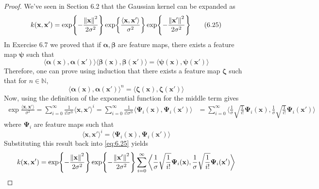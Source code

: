 \vspace{1em}

\begin{proof}
    We've seen in Section 6.2 that the Gaussian kernel can be expanded
    as
    \begin{equation*}
        k(\mathbf{x}, \mathbf{x}') 
        = \exp{-\frac{\norm{\mathbf{x}}^2}{2\sigma^2}}
        \exp{\frac{\langle \mathbf{x}, \mathbf{x}' \rangle}{\sigma^2}}
        \exp{-\frac{\norm{\mathbf{x}'}^2}{2\sigma^2}}
        \tag{6.25}\label{eq:6.25}
    \end{equation*}
    In Exercise 6.7 we proved that if $\bm{\alpha}, \bm{\beta}$ are feature maps,
    there exists a feature map $\bm{\psi}$ such that
    \[
        \langle \bm{\alpha}(\mathbf{x}), \bm{\alpha}(\mathbf{x}') \rangle
        \langle \bm{\beta}(\mathbf{x}), \bm{\beta}(\mathbf{x}') \rangle
        = \langle \bm{\bm{\psi}}(\mathbf{x}), \bm{\psi}(\mathbf{x}') \rangle
    \] 
    Therefore, one can prove using induction that there exists a feature map $\bm{\zeta}$
    such that for $n \in \mathbb{N}$,
    \[
        \langle \bm{\alpha}(\mathbf{x}), \bm{\alpha}(\mathbf{x}')\rangle^n
        = \langle \bm{\zeta}(\mathbf{x}), \bm{\zeta}(\mathbf{x}') \rangle
    \] 
    Now, using the definition of the exponential function for the middle term gives
    \begin{align*}
        \exp{\frac{\langle \mathbf{x}, \mathbf{x}' \rangle}{\sigma^2}}
        = \sum_{i=0}^{\infty} \frac{1}{i! \sigma^{2i}} \langle \mathbf{x}, \mathbf{x}' \rangle^i
        = \sum_{i=0}^{\infty} \frac{1}{i! \sigma^{2i}}
        \langle \bm{\Psi}_i(\mathbf{x}), \bm{\Psi}_i(\mathbf{x}') \rangle
        &= \sum_{i=0}^{\infty} 
        \bigg\langle \frac{1}{\sigma}\sqrt{\frac{1}{i!}} \bm{\Psi}_i(\mathbf{x}),
        \frac{1}{\sigma}\sqrt{\frac{1}{i!}} \bm{\Psi}_i(\mathbf{x}') \bigg\rangle
    \end{align*}
    where $\bm{\Psi}_i$ are feature maps such that
    \[
        \langle\mathbf{x}, \mathbf{x}'\rangle^i 
        = \langle \bm{\Psi}_i(\mathbf{x}), \bm{\Psi}_i(\mathbf{x}')\rangle 
    \] 
    Substituting this result back into \eqref{eq:6.25} yields
    \begin{align*}
        k(\mathbf{x}, \mathbf{x}')
        &= \exp{-\frac{\norm{\mathbf{x}}^2}{2\sigma^2}}
        \exp{-\frac{\norm{\mathbf{x}'}^2}{2\sigma^2}}
        \sum_{i=0}^{\infty} \bigg\langle \frac{1}{\sigma}\sqrt{\frac{1}{i!}} \bm{\Psi}_i(\mathbf{x}),
        \frac{1}{\sigma}\sqrt{\frac{1}{i!}} \bm{\Psi}_i(\mathbf{x}') \bigg\rangle \\

\end{align*}
\end{proof}
